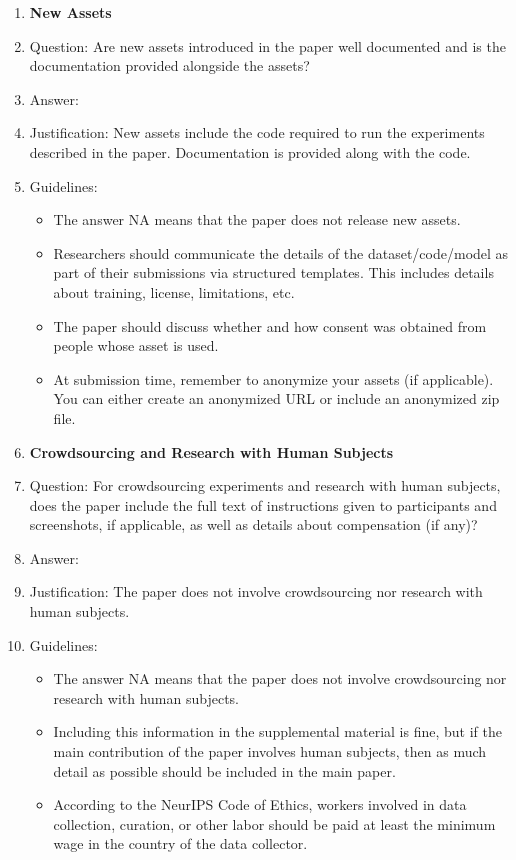 \documentclass[letterpaper]{article}
\begin{document}
\begin{enumerate}
\item {\bf New Assets}
    \item[] Question: Are new assets introduced in the paper well documented and is the documentation provided alongside the assets?
    \item[] Answer: \answerYes{} %
    \item[] Justification: New assets include the code required to run the experiments described in the paper. Documentation is provided along with the code.
    \item[] Guidelines:
    \begin{itemize}
        \item The answer NA means that the paper does not release new assets.
        \item Researchers should communicate the details of the dataset/code/model as part of their submissions via structured templates. This includes details about training, license, limitations, etc. 
        \item The paper should discuss whether and how consent was obtained from people whose asset is used.
        \item At submission time, remember to anonymize your assets (if applicable). You can either create an anonymized URL or include an anonymized zip file.
    \end{itemize}

\item {\bf Crowdsourcing and Research with Human Subjects}
    \item[] Question: For crowdsourcing experiments and research with human subjects, does the paper include the full text of instructions given to participants and screenshots, if applicable, as well as details about compensation (if any)? 
    \item[] Answer: \answerNA{} %
    \item[] Justification: The paper does not involve crowdsourcing nor research with human subjects.
    \item[] Guidelines:
    \begin{itemize}
        \item The answer NA means that the paper does not involve crowdsourcing nor research with human subjects.
        \item Including this information in the supplemental material is fine, but if the main contribution of the paper involves human subjects, then as much detail as possible should be included in the main paper. 
        \item According to the NeurIPS Code of Ethics, workers involved in data collection, curation, or other labor should be paid at least the minimum wage in the country of the data collector. 
    \end{itemize}


\end{enumerate}
\end{document}
